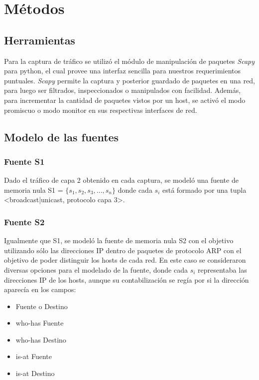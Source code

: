 \section{Métodos}
\subsection*{Herramientas}
Para la captura de tráfico se utilizó el módulo de manipulación de paquetes \emph{Scapy} para python, el cual provee una interfaz sencilla para nuestros requerimientos puntuales. \emph{Scapy} permite la captura y posterior guardado de paquetes en una red, para luego ser filtrados, inspeccionados o manipulados con facilidad. Además, para incrementar la cantidad de paquetes vistos por un host, se activó el modo promiscuo o modo monitor en sus respectivas interfaces de red.

\subsection*{Modelo de las fuentes}

\subsubsection*{Fuente S1}
Dado el tráfico de capa 2 obtenido en cada captura, se modeló una fuente de memoria nula S1 = $ \{ s_{1}, s_{2}, s_{3},...,s_{n} \}$ donde cada $ s_{i} $ está formado por una tupla <broadcast|unicast, protocolo capa 3>.

\subsubsection*{Fuente S2}
Igualmente que S1, se modeló la fuente de memoria nula S2 con el objetivo utilizando sólo las direcciones IP dentro de paquetes de protocolo ARP con el objetivo de poder distinguir los hosts de cada red. En este caso se consideraron diversas opciones para el modelado de la fuente, donde cada $ s_{i} $ representaba las direcciones IP de los hosts, aunque su contabilización se regía por si la dirección aparecía en los campos:
\begin{itemize}
	\item Fuente o Destino
	\item who-has Fuente
	\item who-has Destino
	\item is-at Fuente
	\item is-at Destino
\end{itemize}

